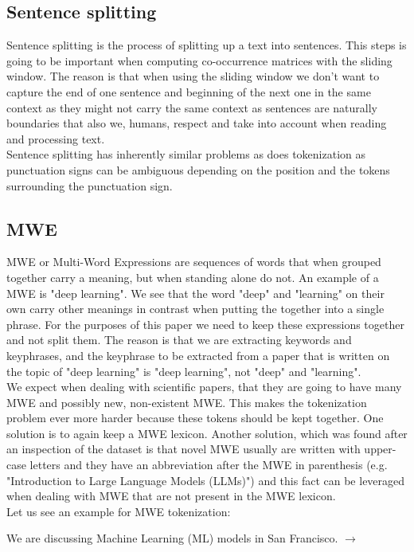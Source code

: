 \documentclass[12pt]{article}
\numberwithin{equation}{section}
\begin{document}
\begin{spacing}{1.5}
	\subsection{Sentence splitting}
	Sentence splitting is the process of splitting up a text into sentences. This steps is going to be important when computing co-occurrence matrices with the sliding window. The reason is that when using the sliding window we don't want to capture the end of one sentence and beginning of the next one in the same context as they might not carry the same context as sentences are naturally boundaries that also we, humans, respect and take into account when reading and processing text. \\
	Sentence splitting has inherently similar problems as does tokenization as punctuation signs can be ambiguous depending on the position and the tokens surrounding the punctuation sign. 
	
	\subsection{MWE}
	MWE or Multi-Word Expressions are sequences of words that when grouped together carry a meaning, but when standing alone do not. An example of a MWE is "deep learning". We see that the word "deep" and "learning" on their own carry other meanings in contrast when putting the together into a single phrase. For the purposes of this paper we need to keep these expressions together and not split them. The reason is that we are extracting keywords and keyphrases, and the keyphrase to be extracted from a paper that is written on the topic of "deep learning" is "deep learning", not "deep" and "learning". \\
	We expect when dealing with scientific papers, that they are going to have many MWE and possibly new, non-existent MWE. This makes the tokenization problem ever more harder because these tokens should be kept together. One solution is to again keep a MWE lexicon. Another solution, which was found after an inspection of the dataset is that novel MWE usually are written with upper-case letters and they have an abbreviation after the MWE in parenthesis (e.g. "Introduction to Large Language Models (LLMs)") and this fact can be leveraged when dealing with MWE that are not present in the MWE lexicon. \\
	Let us see an example for MWE tokenization:
	\begin{center}
		We are discussing Machine Learning (ML) models in San Francisco. $\rightarrow$ \\
		

\end{center}
\end{spacing}
\end{document}
